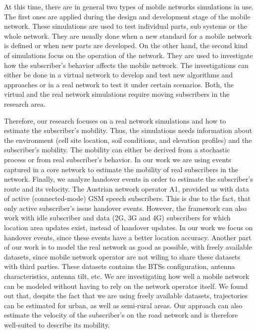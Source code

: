 At this time, there are in general two types of mobile networks simulations in use. The first ones are applied during the design and development stage of the mobile network. These simulations are used to test individual parts, sub systems or the whole network. They are usually done when a new standard for a mobile network is defined or when new parts are developed. On the other hand, the second kind of simulations focus on the operation of the network. They are used to investigate how the subscriber's behavior affects the mobile network. The investigations can either be done in a virtual network to develop and test new algorithms and approaches or in a real network to test it under certain scenarios. Both, the virtual and the real network simulations require moving subscribers in the research area.

Therefore, our research focuses on a real network simulations and how to estimate the subscriber's mobility. Thus, the simulations needs information about the environment (cell site location, soil conditions, and elevation profiles) and the subscriber's mobility. The mobility can either be derived from a stochastic process or from real subscriber's behavior. In our work we are using events captured in a core network to estimate the mobility of real subscribers in the network. Finally, we analyze handover events in order to estimate the subscriber's route and its velocity.
The Austrian network operator A1, provided us with data of active (connected-mode) GSM speech subscribers. This is due to the fact, that only active subscriber's issue handover events. However, the framework can also work with idle subscriber and data (2G, 3G and 4G) subscribers for which location area updates exist, instead of handover updates. In our work we focus on handover events, since these events have a better location accuracy.
Another part of our work is to model the real network as good as possible, with freely available datasets, since mobile network operator are not wiling to share these datasets with third parties. These datasets contains the BTSs configuration, antenna characteristics, antenna tilt, etc. We are investigating how well a mobile network can be modeled without having to rely on the network operator itself.
We found out that, despite the fact that we are using freely available datasets, trajectories can be estimated for urban, as well as semi-rural areas. Our approach can also estimate the velocity of the subscriber's on the road network and is therefore well-suited to describe its mobility.

